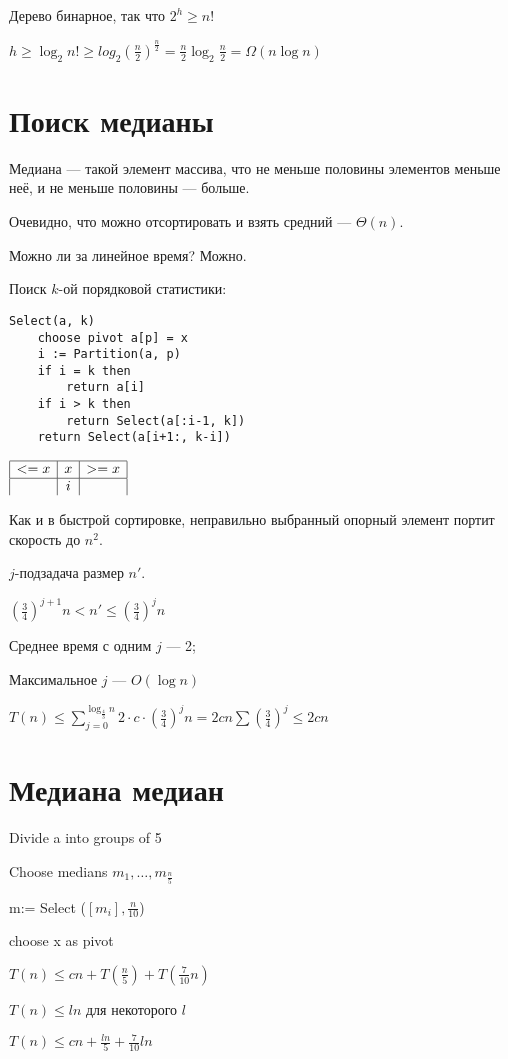 \documentclass[11pt,a4paper]{article}
\begin{document}
Дерево бинарное, так что $2^h \geqslant n!$

$h \geqslant \log_2 n! \geqslant log_2\left( \frac{n}{2} \right)^{\frac{n}{2}} = \frac{n}{2}\log_2\frac{n}{2} = \Omega(n\log n)$

\section*{Поиск медианы}

Медиана --- такой элемент массива, что не меньше половины элементов меньше неё, и не меньше половины --- больше.

Очевидно, что можно отсортировать и взять средний --- $\Theta(n)$.

Можно ли за линейное время? Можно.


Поиск $k$-ой порядковой статистики:
\begin{lstlisting}
Select(a, k)
    choose pivot a[p] = x
    i := Partition(a, p)
    if i = k then
        return a[i]
    if i > k then
        return Select(a[:i-1, k])
    return Select(a[i+1:, k-i])
\end{lstlisting}

$\begin{array}{|c|c|c|}
    \hline
    <=x&x&>=x\\
    \hline
    &i&
\end{array}$

Как и в быстрой сортировке, неправильно выбранный опорный элемент портит скорость до $n^2$.

$j$-подзадача размер $n'$.

$\left( \frac{3}{4} \right)^{j+1}n < n' \leqslant \left( \frac{3}{4} \right)^{j}n$

Среднее время с одним $j$ --- 2;

Максимальное $j$ --- $O(\log n)$

$T(n) \leqslant \sum\limits_{j=0}^{\log_{\frac{4}{3}}n} 2\cdot c\cdot \left( \frac{3}{4} \right)^jn = 2cn\sum\left( \frac{3}{4} \right)^j \leqslant 2cn$

\section*{Медиана медиан}
 
Divide a into groups of 5

Choose medians $m_{1}, \ldots, m_{\frac{n}{5}}$

m:= Select ($[m_i], \frac{n}{10}$)

choose x as pivot



$T(n) \leqslant cn + T\left(\frac{n}{5}\right) + T\left( \frac{7}{10}n \right)$

$T(n) \leqslant ln$ для некоторого $l$

$T(n) \leqslant cn + \frac{ln}{5} + \frac{7}{10}ln$
\end{document}
